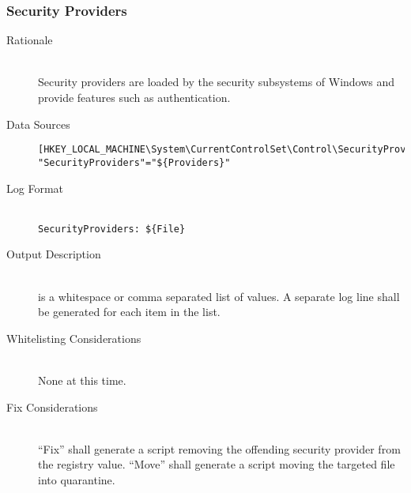 \subsubsection{Security Providers}
\begin{description}
\item[Rationale] \hfill \\
Security providers are loaded by the security subsystems of Windows and provide
features such as authentication.
\item[Data Sources] \hfill
\vspace{-\baselineskip}
\begin{verbatim}
[HKEY_LOCAL_MACHINE\System\CurrentControlSet\Control\SecurityProviders]
"SecurityProviders"="${Providers}"
\end{verbatim}
\item[Log Format] \hfill \\
\verb|SecurityProviders: ${File}|
\item[Output Description] \hfill \\
 is a whitespace or comma separated list of values. A separate
log line shall be generated for each item in the list.
\item[Whitelisting Considerations] \hfill \\
None at this time.
\item[Fix Considerations] \hfill \\
``Fix'' shall generate a script removing the offending security provider from
the registry value. ``Move'' shall generate a script moving the targeted file
into quarantine.
\end{description}

